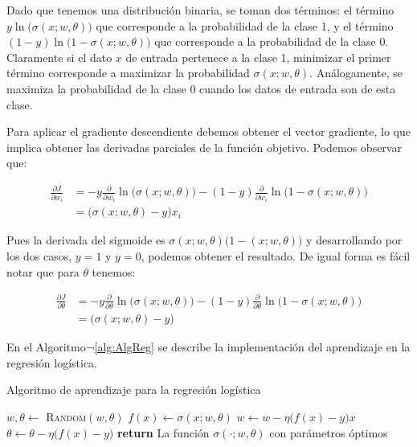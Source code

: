 Dado que tenemos una distribución binaria, se toman dos términos: el término $y \ln\big( \sigma(x; w, \theta)\big)$ que corresponde a la probabilidad de la clase 1, y el término $(1-y) \ln\big( 1-\sigma(x; w, \theta)\big)$ que corresponde a la probabilidad de la clase 0. Claramente si el dato $x$ de entrada pertenece a la clase 1, minimizar el primer término corresponde a maximizar la probabilidad $\sigma(x; w, \theta)$. Análogamente, se maximiza la probabilidad de la clase 0 cuando los datos de entrada son de esta clase.

Para aplicar el gradiente descendiente debemos obtener el vector gradiente, lo que implica obtener las derivadas parciales de la función objetivo. Podemos observar que:

\begin{align*}
    \frac{\partial J }{\partial w_i} &= - y \frac{\partial}{\partial w_i} \ln\big( \sigma(x; w, \theta)\big) - (1- y) \frac{\partial }{\partial w_i}  \ln\big( 1-\sigma(x; w, \theta) \big) \\
        &= \big( \sigma(x; w, \theta) - y \big) x_i 
\end{align*}

Pues la derivada del sigmoide es $\sigma(x; w, \theta)\big(1-(x; w, \theta)\big)$ y desarrollando por los dos casos, $y=1$ y $y=0$, podemos obtener el resultado. De igual forma es fácil notar que para $\theta$ tenemos:

\begin{align*}
    \frac{\partial J }{\partial \theta} &= - y \frac{\partial}{\partial \theta} \ln\big( \sigma(x; w, \theta)\big) - (1- y) \frac{\partial }{\partial \theta}  \ln\big( 1-\sigma(x; w, \theta) \big) \\
        &= \big( \sigma(x; w, \theta) - y \big)
\end{align*}

En el Algoritmo¬\ref{alg:AlgReg} se describe la implementación del aprendizaje en la regresión logística.


\begin{algorithm}
 \caption{Algoritmo de aprendizaje para la regresión logística}\label{alg:AlgReg}
 \begin{algorithmic}
    \State $w, \theta \leftarrow$ \textsc{Random}$(w, \theta)$
            \State $f(x) \leftarrow \sigma(x; w, \theta) $
            \State $w \leftarrow w - \eta \big( f(x) - y \big) x $
            \State $\theta \leftarrow \theta - \eta \big( f(x) - y \big) $
        \EndFor
    \EndFor
    \Statte \textbf{return} La función $\sigma(\cdot; w, \theta)$ con parámetros óptimos
  \EndFunction
 \end{algorithmic}
\end{algorithm}

